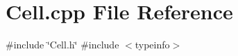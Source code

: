 \section{Cell.\+cpp File Reference}
\label{Cell_8cpp}
{\ttfamily \#include \char`\"{}Cell.\+h\char`\"{}}\newline
{\ttfamily \#include $<$typeinfo$>$}\newline
